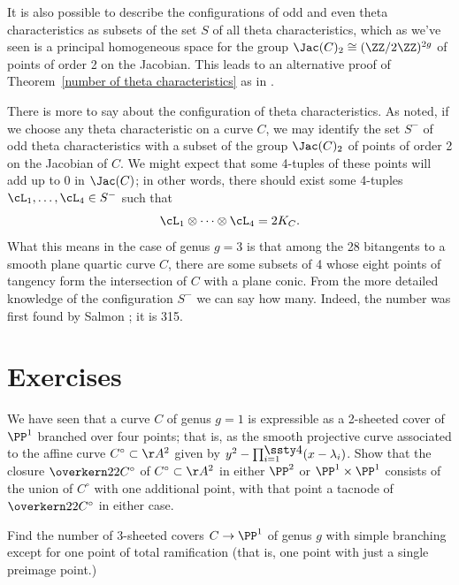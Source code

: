  It is also
 possible to describe the configurations of odd and even theta
characteristics as subsets of the set $S$ of all theta characteristics,
which as we've seen is a principal
homogeneous space for the group
$\Jac(C)_2 \cong (\ZZ/2\ZZ)^{2g}$ of
points of order 2 on the Jacobian.
%
 This leads to an alternative proof of
Theorem~\ref{number of theta characteristics} as in \cite{JHPaper}.

\begin{fact}
There is more to say about the configuration of theta characteristics.
As noted, if we choose any theta characteristic on a curve $C$, we may
 identify the set $S^-$ of odd theta characteristics with a subset of the
 group $\Jac(C)_2$ of points of order 2 on the Jacobian of $C$. We might
 expect that some 4-tuples of these points will add up to 0 in $\Jac(C)$;
 in other words, there should exist some 4-tuples $\cL_1,\dots,\cL_4
 \in S^-$ such that
$$
\cL_1\otimes \dots \otimes\cL_4 = 2K_C.
$$
What this means in the case of genus $g=3$ is that among the 28 bitangents
%
to a smooth plane quartic curve $C$, there are some subsets of 4 whose
eight points of tangency form the intersection of $C$ with a plane
conic. From the more detailed knowledge of the configuration $S^-$
we can say how many. Indeed, the number was first found by Salmon
%
\citeyear{MR0115124};
it is 315.
%
\end{fact}

\section{Exercises}
 \begin{exercise}
  We have seen that a curve $C$ of genus $g=1$ is expressible as a
  2-sheeted cover of $\PP^1$ branched over four points; that is, as
  the smooth projective curve associated to the affine curve $C^\circ
  \subset \AA^2$ given by $y^2 -
\smash{\prod_{i=1}^{\smash{\lower1.5pt\hbox{$\ssty4$}}} (x-\lambda_i)}$.
  Show that
  the closure $\overkern22{C^\circ}$ of $C^\circ \subset \AA^2$ in either
  $\PP^2$ or $\PP^1 \times \PP^1$ consists of the union of $C^\circ$ with
  one additional point, with that point a tacnode of $\overkern22{C^\circ}$
  in either case.
  \end{exercise}

\begin{exercise}
Find the number of
3-sheeted covers
%
$C \to \PP^1$ of genus $g$ with
simple branching except for one point of
%
%
total ramification
%
(that is,
one point with just a single preimage point.)
\end{exercise}

